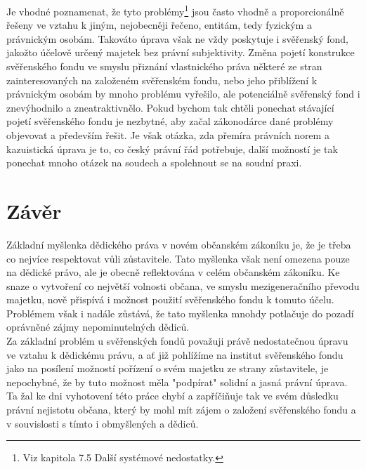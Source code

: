 \documentclass{article}
\begin{document}
Je vhodné poznamenat, že tyto problémy\footnote{Viz kapitola 7.5 Další systémové nedostatky.} jsou často vhodně a proporcionálně řešeny ve vztahu k jiným, nejobecněji řečeno, entitám, tedy fyzickým a právnickým osobám. Takováto úprava však ne vždy poskytuje i svěřenský fond, jakožto účelově určený majetek bez právní subjektivity. Změna pojetí konstrukce svěřenského fondu ve smyslu přiznání vlastnického práva některé ze stran zainteresovaných na založeném svěřenském fondu, nebo jeho přiblížení k právnickým osobám by mnoho problému vyřešilo, ale potenciálně svěřenský fond i znevýhodnilo a zneatraktivnělo. Pokud bychom tak chtěli ponechat stávající pojetí svěřenského fondu je nezbytné, aby začal zákonodárce dané problémy objevovat a především řešit. Je však otázka, zda přemíra právních norem a kazuistická úprava je to, co český právní řád potřebuje, další možností je tak ponechat mnoho otázek na soudech a spolehnout se na soudní praxi.\\

\newpage

\section{Závěr}


Základní myšlenka dědického práva v novém občanském zákoníku je, že je třeba co nejvíce respektovat vůli zůstavitele. Tato myšlenka však není omezena pouze na dědické právo, ale je obecně reflektována v celém občanském zákoníku. Ke snaze o vytvoření co největší volnosti občana, ve smyslu mezigeneračního převodu majetku, nově přispívá i možnost použití svěřenského fondu k tomuto účelu. Problémem však i nadále zůstává, že tato myšlenka mnohdy potlačuje do pozadí oprávněné zájmy nepominutelných dědiců.\\

Za základní problém u svěřenských fondů považuji právě nedostatečnou úpravu ve vztahu k dědickému právu, a ať již pohlížíme na institut svěřenského fondu jako na posílení možností pořízení o svém majetku ze strany zůstavitele, je nepochybné, že by tuto možnost měla "podpírat" solidní a jasná právní úprava. Ta žal ke dni vyhotovení této práce chybí a zapříčiňuje tak ve svém důsledku právní nejistotu občana, který by mohl mít zájem o založení svěřenského fondu a v souvislosti s tímto i obmyšlených a dědiců.\\
\end{document}
